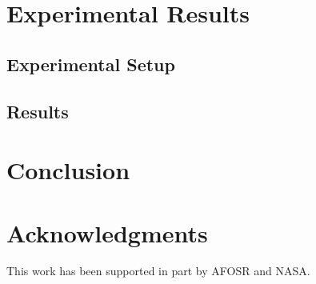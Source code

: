 \documentclass[]{aiaa-tc}%
\begin{document}
\section{Experimental Results}

\subsection{Experimental Setup}

\subsection{Results}

\section{Conclusion}



\section{Acknowledgments}
\label{sec:Acknowledgments}
This work has been supported in part by AFOSR and NASA.



\end{document}
